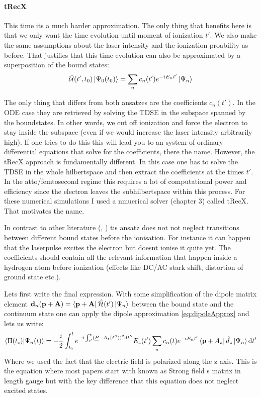 \paragraph{tRecX}
This time its a much harder approximation.
The only thing that benefits here is that we only want the time evolution until moment of ionization $t'$.
We also make the same assumptions about the laser intensity and the ionization proability as before.
That justifies that this time evolution can also be approximated by a superposition of the bound states:
\begin{equation*}
    \hat{\mathcal{U}}(t',t_0)\ket{\Psi_0(t_0)} = \sum_{n}c_n(t')e^{-iE_nt'}\ket{\Psi_n}
\end{equation*}

\bigskip

The only thing that differs from both ansatzes are the coefficients $c_n(t')$.
In the ODE case they are retrieved by solving the TDSE in the subspace spanned by the boundstates.
In other words, we cut off ionization and force the electron to stay inside the subspace (even if we would increase the laser intensity arbitrarily high).
If one tries to do this this will lead you to an system of ordinary differential equations that solve for the coefficients, there the name.
However, the tRecX approach is fundamentally different.
In this case one has to solve the TDSE in the whole hilbertspace and then extract the coefficients at the times $t'$.
In the atto/femtosecond regime this requires a lot of computational power and efficiency since the electron leaves the subhilbertspace within this process.
For these numerical simulations I used a nmuerical solver (chapter 3) called tRecX.
That motivates the name.

In contrast to other literature (\cite{Theory_NPS}, \cite{Ivanov20012005}) tis ansatz does not not neglect transitions between different bound states before the ionisation. 
For instance it can happen that the laserpulse excites the electron but doesnt ionise it quite yet. 
The coefficients should contain all the relevant information that happen inside a hydrogen atom before ionization (effects like DC/AC stark shift, distortion of ground state etc.).

Lets first write the final expression. 
With some simplification of the dipole matrix element $\mathbf{d}_n(\mathbf{p}+\mathbf{A}) = \bra{\mathbf{p}+\mathbf{A}}\hat{\mathcal{H}}(t')\ket{\Psi_n}$ between the bound state and the continuum state one can apply the dipole approximation \eqref{eq:dipoleApprox} and lets us write:
\begin{equation*}
    \braket{\Pi(t_{\mathrm{c}})|\Psi_n(t)} = -\frac{i}{2}\int_{t_0}^{t} e^{-i \int_{t'}^{t} (\underline{P} - A_z(t''))^2 \mathrm{d} t''}E_z(t')\sum_{n}c_n(t)e^{-iE_nt'}\bra{\mathbf{p}+A_z}\hat{d}_z\ket{\Psi_n} \mathrm{d} t'       \label{eq:smatrix}
\end{equation*}
Where we used the fact that the electric field is polarized along the z axis.
This is the equation where most papers start with \cite{Theory_NPS} known as Strong field s matrix in length gauge but with the key difference that this equation does not neglect excited states.




